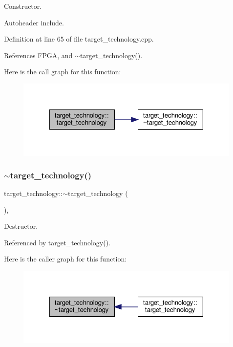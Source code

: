 Constructor. 

Autoheader include. 

Definition at line 65 of file target\+\_\+technology.\+cpp.



References F\+P\+GA, and $\sim$target\+\_\+technology().

Here is the call graph for this function\+:
\nopagebreak
\begin{figure}[H]
\begin{center}
\leavevmode
\includegraphics[width=316pt]{d8/d05/classtarget__technology_a5e939d5581b952ea83d34d496d1d2965_cgraph}
\end{center}
\end{figure}
\mbox{\label{classtarget__technology_a12b5a2b034e285b90565eb00c6054773}} 
\subsubsection{\texorpdfstring{$\sim$target\+\_\+technology()}{~target\_technology()}}
{\footnotesize\ttfamily target\+\_\+technology\+::$\sim$target\+\_\+technology (\begin{DoxyParamCaption}{ }\end{DoxyParamCaption})\hspace{0.3cm}{\ttfamily [virtual]}, {\ttfamily [default]}}



Destructor. 



Referenced by target\+\_\+technology().

Here is the caller graph for this function\+:
\nopagebreak
\begin{figure}[H]
\begin{center}
\leavevmode
\includegraphics[width=316pt]{d8/d05/classtarget__technology_a12b5a2b034e285b90565eb00c6054773_icgraph}
\end{center}
\end{figure}



